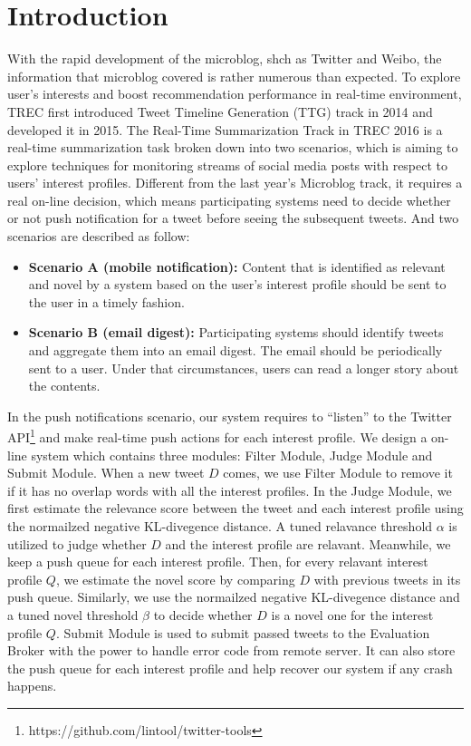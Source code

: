 \section{Introduction}
With the rapid development of the microblog, shch as Twitter and Weibo,
the information that microblog covered is rather numerous than expected.
To explore user's interests and boost recommendation performance in real-time environment,
TREC first introduced Tweet Timeline Generation (TTG) track in 2014\cite{lin2014overview} and developed it in 2015.
The Real-Time Summarization Track in TREC 2016 is a real-time summarization task broken down into two scenarios,
which is aiming to explore techniques for monitoring streams of social media posts with respect to users' interest profiles.
Different from the last year's Microblog track, it requires a real on-line decision,
which means participating systems need to decide whether or not push notification for a tweet before seeing the subsequent tweets.
And two scenarios are described as follow:

\begin{itemize}
\item \textbf{Scenario A (mobile notification):} Content that is identified as relevant and novel by a system based on the user's interest profile should be sent to the user in a timely fashion. 
\item \textbf{Scenario B (email digest):} Participating systems should identify tweets and aggregate them into an email digest. The email should be periodically sent to a user. Under that circumstances, users can read a longer story about the contents.
\end{itemize}

In the push notifications scenario, our system requires to ``listen'' to
the Twitter API\footnote{https://github.com/lintool/twitter-tools}
and make real-time push actions for each interest profile.
We design a on-line system which contains three modules:
Filter Module, Judge Module and Submit Module.
When a new tweet $D$ comes, we use Filter Module to remove it
if it has no overlap words with all the interest profiles.
In the Judge Module, we first estimate the relevance score between the tweet
and each interest profile using the normailzed negative KL-divegence distance.
A tuned relavance threshold $\alpha$ is utilized to judge whether $D$ and
the interest profile are relavant.
Meanwhile, we keep a push queue for each interest profile.
Then, for every relavant interest profile $Q$, we estimate the novel score by comparing $D$
with previous tweets in its push queue.
Similarly, we use the normailzed negative KL-divegence distance and a tuned
novel threshold $\beta$ to decide whether $D$ is a novel one for the interest profile $Q$.
Submit Module is used to submit passed tweets to the Evaluation Broker with the power to 
handle error code from remote server.
It can also store the push queue for each interest profile and help recover our system
if any crash happens.

